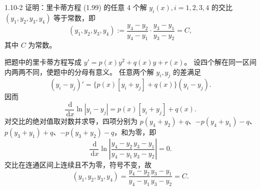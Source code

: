\documentclass[UTF8,a4paper,11pt]{ctexart}
\newcommand{\dd}{\,\mathrm d}
\begin{document}
\begin{problem}{1.10-2}
证明：里卡蒂方程 (1.99) 的任意 4 个解 $y_i(x),i=1,2,3,4$ 的交比 $(y_1,y_2,y_3,y_4)$ 等于常数，即
  \[
    (y_1,y_2,y_3,y_4)
    :=\frac{y_4-y_2}{y_4-y_1}\cdot\frac{y_3-y_1}{y_3-y_2}
    =C,
  \]
  其中 $C$ 为常数。
\end{problem}

\begin{solution}
把题中的里卡蒂方程写成
$y'=p(x)y^2+q(x)y+r(x)$。
设四个解在同一区间内两两不同，使题中的分母有意义。
任意两个解 $y_i,y_j$ 的差满足
\[
(y_i-y_j)'=\{p(x)[y_i+y_j]+q(x)\}(y_i-y_j).
\]
因而
\[
\frac{\dd}{\dd x}\ln|y_i-y_j|
=p(x)[y_i+y_j]+q(x).
\]
对交比的绝对值取对数并求导，四项分别为
$p(y_4+y_2)+q$、$-p(y_4+y_1)-q$、
$p(y_3+y_1)+q$、$-p(y_3+y_2)-q$，和为零，即
\[
\frac{\dd}{\dd x}\ln\left|
\frac{y_4-y_2}{y_4-y_1}\frac{y_3-y_1}{y_3-y_2}
\right|=0.
\]
交比在连通区间上连续且不为零，符号不变，故
\[
\boxed{(y_1,y_2,y_3,y_4)
=\frac{y_4-y_2}{y_4-y_1}\frac{y_3-y_1}{y_3-y_2}=C}.
\]
\end{solution}
\end{document}
